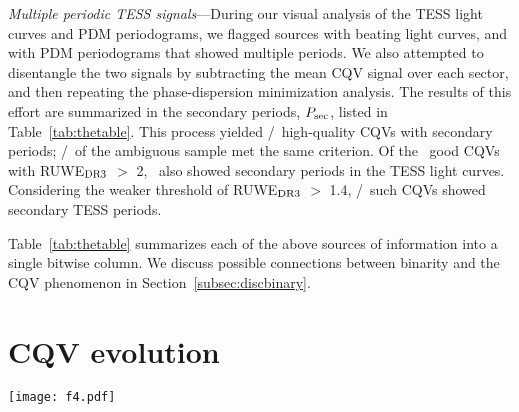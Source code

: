 \documentclass[11pt,twocolumn,tighten]{aastex63}
\begin{document}
{\it Multiple periodic TESS signals}---During our visual analysis of
the TESS light curves and PDM periodograms, we flagged sources with
beating light curves, and with PDM periodograms that showed multiple
periods.  We also attempted to disentangle the two signals by
subtracting the mean CQV signal over each sector, and then repeating
the phase-dispersion minimization analysis.  The results of this effort
are summarized in the secondary periods, $P_{\rm sec}$, listed in
Table~\ref{tab:thetable}.  This process yielded
\ngoodmultperiodflag/\ngoods\ high-quality CQVs with secondary
periods; \nmaybemultperiodflag/\nmaybes\ of the ambiguous sample met
the same criterion.  Of the \ngoodhighruwe\ good CQVs with RUWE$_{\rm
DR3}$ $>$ 2, \ngoodruweandmultperiod\ also showed secondary periods in
the TESS light curves.  Considering the weaker threshold of RUWE$_{\rm
DR3}$ $>$ 1.4, \ngoodweakruweandmultperiod/\ngoodweakruwe\ such CQVs
showed secondary TESS periods.

Table~\ref{tab:thetable} summarizes each of the above sources of
information into a single bitwise column.  We discuss possible
connections between binarity and the CQV phenomenon in
Section~\ref{subsec:discbinary}.


\section{CQV evolution}
\label{sec:evoln}

\begin{figure*}[!tp]
	\begin{center}
		\centering
		\texttt{[image: f4.pdf]}
		\vspace{-0.6cm}
		\caption{
			{\bf CQVs keep their periods but change their shapes.}
			Out of the \ngoods\ CQVs in Figure~\ref{fig:cqvs}, 32 had
			120-second cadence TESS data available for a baseline of at
			least two years; the 27 brightest are shown here due to space
			constraints.  Each panel shows one sector of TESS data, and is
			phased to its deepest minimum in flux.  Each panel's title shows
			the TIC identifier and approximate period in hours.  Text insets
			show the TESS sector numbers, which generally span two years, or
			at least 1{,}000 cycles.  The vertical scale is fixed across
			sectors to clarify shape changes.  Gray circles are raw 2-minute
			data; colored circles bin to 300 points per cycle. 
		}
		\label{fig:evoln}
	\end{center}
\end{figure*}
\end{document}
